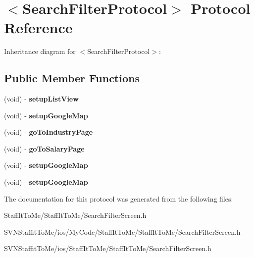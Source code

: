 \hypertarget{protocol_search_filter_protocol-p}{
\section{$<$\-Search\-Filter\-Protocol$>$ \-Protocol \-Reference}
\label{protocol_search_filter_protocol-p}
}


\-Inheritance diagram for $<$\-Search\-Filter\-Protocol$>$\-:
\subsection*{\-Public \-Member \-Functions}
\begin{DoxyCompactItemize}
\item 
\hypertarget{protocol_search_filter_protocol-p_a8c75b1beb75ed043e1bab2f0e68edea5}{
(void) -\/ {\bfseries setup\-List\-View}}
\label{protocol_search_filter_protocol-p_a8c75b1beb75ed043e1bab2f0e68edea5}

\item 
\hypertarget{protocol_search_filter_protocol-p_a0d4909cbf5b49621b593c1d0caa8d146}{
(void) -\/ {\bfseries setup\-Google\-Map}}
\label{protocol_search_filter_protocol-p_a0d4909cbf5b49621b593c1d0caa8d146}

\item 
\hypertarget{protocol_search_filter_protocol-p_a56e1ee264c3a01c3d3ba89d280e62f92}{
(void) -\/ {\bfseries go\-To\-Industry\-Page}}
\label{protocol_search_filter_protocol-p_a56e1ee264c3a01c3d3ba89d280e62f92}

\item 
\hypertarget{protocol_search_filter_protocol-p_a1d79717ffeb75025dc96e55a312bdf45}{
(void) -\/ {\bfseries go\-To\-Salary\-Page}}
\label{protocol_search_filter_protocol-p_a1d79717ffeb75025dc96e55a312bdf45}

\item 
\hypertarget{protocol_search_filter_protocol-p_a0d4909cbf5b49621b593c1d0caa8d146}{
(void) -\/ {\bfseries setup\-Google\-Map}}
\label{protocol_search_filter_protocol-p_a0d4909cbf5b49621b593c1d0caa8d146}

\item 
\hypertarget{protocol_search_filter_protocol-p_a0d4909cbf5b49621b593c1d0caa8d146}{
(void) -\/ {\bfseries setup\-Google\-Map}}
\label{protocol_search_filter_protocol-p_a0d4909cbf5b49621b593c1d0caa8d146}

\end{DoxyCompactItemize}


\-The documentation for this protocol was generated from the following files\-:\begin{DoxyCompactItemize}
\item 
\-Staff\-It\-To\-Me/\-Staff\-It\-To\-Me/\-Search\-Filter\-Screen.\-h\item 
\-S\-V\-N\-Staffit\-To\-Me/ios/\-My\-Code/\-Staff\-It\-To\-Me/\-Staff\-It\-To\-Me/\-Search\-Filter\-Screen.\-h\item 
\-S\-V\-N\-Staffit\-To\-Me/ios/\-Staff\-It\-To\-Me/\-Staff\-It\-To\-Me/\-Search\-Filter\-Screen.\-h\end{DoxyCompactItemize}
